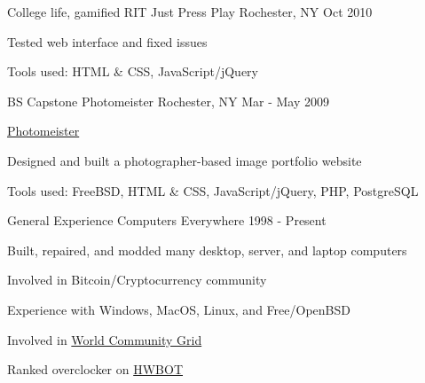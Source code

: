 \begin{cventries}
  \cventry
    {College life, gamified} %
    {RIT Just Press Play} %
    {Rochester, NY} %
    {Oct 2010} %
    {
      \begin{cvitems} %
        \item {Tested web interface and fixed issues}
        \item {Tools used: HTML \& CSS, JavaScript/jQuery}
      \end{cvitems}
    }


  \cventry
    {BS Capstone} %
    {Photomeister} %
    {Rochester, NY} %
    {Mar - May 2009} %
    {
      \begin{cvitems} %
        \item {\href{https://github.com/desnudopenguino/photomeister}{Photomeister}}
        \item {Designed and built a photographer-based image portfolio website}
        \item {Tools used: FreeBSD, HTML \& CSS, JavaScript/jQuery, PHP, PostgreSQL}
      \end{cvitems}
    }


  \cventry
    {General Experience} %
    {Computers} %
    {Everywhere} %
    {1998 - Present} %
    {
      \begin{cvitems} %
        \item {Built, repaired, and modded many desktop, server, and laptop computers}
        \item {Involved in Bitcoin/Cryptocurrency community}
        \item {Experience with Windows, MacOS, Linux, and Free/OpenBSD}
        \item {Involved in \href{https://www.worldcommunitygrid.org/stats/viewMemberInfo.do?userName=desnudopenguino}{World Community Grid}}
        \item {Ranked overclocker on \href{https://hwbot.org/user/desnudopenguino/}{HWBOT}}
      \end{cvitems}
   }

\end{cventries}
